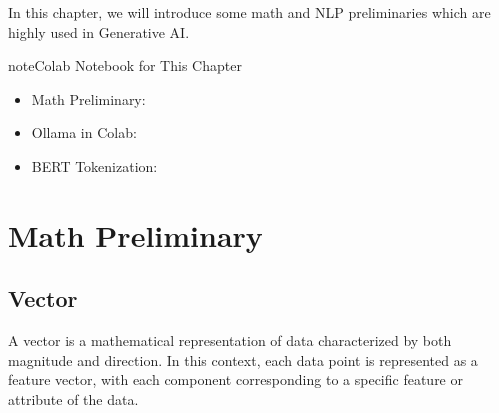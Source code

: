 \documentclass[letterpaper,11pt,english]{sphinxmanual}
\begin{document}
\sphinxAtStartPar
In this chapter, we will introduce some math and NLP preliminaries which are highly
used in Generative AI.

\begin{sphinxadmonition}{note}{Colab Notebook for This Chapter}
\begin{itemize}
\item {} 
\sphinxAtStartPar
Math Preliminary: 

\item {} 
\sphinxAtStartPar
Ollama in Colab: 

\item {} 
\sphinxAtStartPar
BERT Tokenization: 

\end{itemize}
\end{sphinxadmonition}


\section{Math Preliminary}
\label{\detokenize{prelim:math-preliminary}}

\subsection{Vector}
\label{\detokenize{prelim:vector}}
\sphinxAtStartPar
A vector is a mathematical representation of data characterized by both magnitude and
direction. In this context, each data point is represented as a feature vector, with
each component corresponding to a specific feature or attribute of the data.
\end{document}
